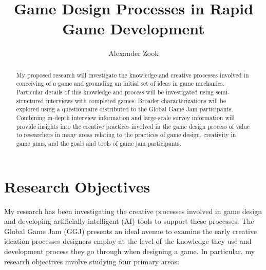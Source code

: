 \documentclass[]{article}
\title{Game Design Processes in Rapid Game Development}
\author{Alexander Zook}
\begin{document}
\maketitle

\begin{abstract}
My proposed research will investigate the knowledge and creative processes involved in conceiving of a game and grounding an initial set of ideas in game mechanics. Particular details of this knowledge and process will be investigated using semi-structured interviews with completed games. Broader characterizations will be explored using a questionnaire distributed to the Global Game Jam participants. Combining in-depth interview information and large-scale survey information will provide insights into the creative practices involved in the game design process of value to researchers in many areas relating to the practices of game design, creativity in game jams, and the goals and tools of game jam participants.
\end{abstract}

\section{Research Objectives}
My research has been investigating the creative processes involved in game design and developing artificially intelligent (AI) tools to support these processes. The Global Game Jam (GGJ) presents an ideal avenue to examine the early creative ideation processes designers employ at the level of the knowledge they use and development process they go through when designing a game. In particular, my research objectives involve studying four primary areas:
\end{document}
